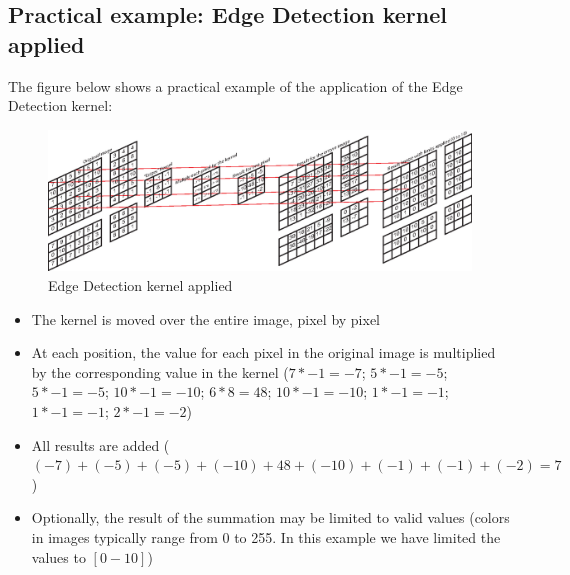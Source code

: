 \subsection{Practical example: Edge Detection kernel applied}
\label{sec:convolution:convolutionalfilters:practicalexampleedgedetectionkernelapplied}
The figure below shows a practical example of the application of the Edge Detection kernel:
\begin{figure}[ht]
    \includegraphics[width=0.90\linewidth]{graphics/convolution/kernel.eps}
    \caption{Edge Detection kernel applied}
    \label{fig:edgedetectionkernelapplication}
\end{figure}
\FloatBarrier
\begin{itemize}
    \item The kernel is moved over the entire image, pixel by pixel
    \item At each position, the value for each pixel in the original image is multiplied by the corresponding value in the kernel ($7 * -1 = -7$; $5 * -1 = -5$; $5 * -1 = -5$; $10 * -1 = -10$; $6 * 8 = 48$; $10 * -1 = -10$; $1 * -1 = -1$; $1 * -1 = -1$; $2 * -1 = -2$)
    \item All results are added ($(-7) + (-5) + (-5) + (-10) + 48 + (-10) + (-1) + (-1) + (-2) = 7$)
    \item Optionally, the result of the summation may be limited to valid values (colors in images typically range from 0 to 255. In this example we have limited the values to $[0-10]$)
\end{itemize}
